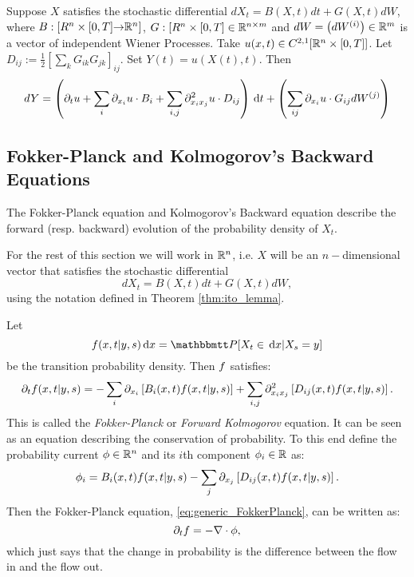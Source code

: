 \begin{thm}
Suppose $X$ satisfies the stochastic differential $dX_t = B(X,t) dt + G(X,t)
dW$, where $B : [R^n \times [0,T] {\rightarrow}  { \mathbb{R} }^n]$, $G: [R^n \times [0,T]\in
{ \mathbb{R} }^{n\times m}$ and $dW = \left(dW^{(i)}\right) \in  { \mathbb{R} }^{ m}$ is a vector of independent Wiener Processes. Take $u(x,t) \in C^{2,1}[ { \mathbb{R} }^n
\times [0,T]]$. Let $D_{ij} := \tfrac{1}{2} \left[{\sum_k G_{ik} G_{jk} }
\right]_{ij}$. Set $Y(t) = u(X(t),t)$. Then
$$
dY =  \left( {\partial}_t u + \sum_i {\partial}_{x_i} u \cdot B_i + 
\sum_{i,j} {\partial}^2_{x_i x_j} u \cdot D_{ij} \right)
\, \mathrm{d} t +
 \left(  \sum_{ij} {\partial}_{x_i} u  \cdot G_{ij} dW^{(j)} 
\right)$$
\label{thm:ito_lemma}
\end{thm} 

\subsection{Fokker-Planck and Kolmogorov's Backward Equations}
The Fokker-Planck equation and Kolmogorov's Backward equation describe the
forward (resp. backward)  evolution of the probability density of $X_t$.

For the rest of this section we will work in $ { \mathbb{R} }^n$, i.e. $X$ will be an $n-$dimensional vector that satisfies the stochastic differential
\begin{equation}
dX_t = B(X,t) dt + G(X,t) dW,
\label{eq:generic_Ito_SDE_Rn}
\end{equation}
using the notation defined in Theorem \ref{thm:ito_lemma}. 

Let 
\begin{equation}
 \f(x,t| y,s) \intd{x} =  \Prob[X_t \in \intd{x} | X_s = y]
 \label{eq:transition_prob_defn} 
 \end{equation}
be the transition probability density. Then ${f}$ satisfies:
\begin{equation}
{\partial}_t {f}(x,t| y,s)= -\sum_i {\partial}_{x_i} \left[ B_i(x,t) {f}(x,t| y,s) \right] 
+ 
\sum_{i,j}  {\partial}^2_{x_i x_j} \left[ D_{ij}(x,t) {f}(x,t| y,s) \right].
\label{eq:generic_FokkerPlanck}
\end{equation} 
This is called the \emph{Fokker-Planck} or \emph{Forward Kolmogorov} equation.
It can be seen as an equation describing the conservation of probability. To this end define the
probability current $\phi \in { \mathbb{R} }^n$ and its $i$th component $\phi_i \in { \mathbb{R} }$
as:
\begin{equation}
\phi_i =   B_i(x,t) {f}(x,t| y,s) 
- \sum_{j}  {\partial}_{x_j} \left[ D_{ij}(x,t) {f}(x,t| y,s)\right].
\label{eq:FokkerPlanck_prob_flux}
\end{equation}
Then the Fokker-Planck equation, \cref{eq:generic_FokkerPlanck}, can be written as:
\begin{equation}
{\partial}_t {f}= -{ \nabla } \cdot \phi,
\label{eq:Fokker_planck_as_prob_flux}
\end{equation}
which just says that the change in probability is the
difference between the flow in and the flow out. 

